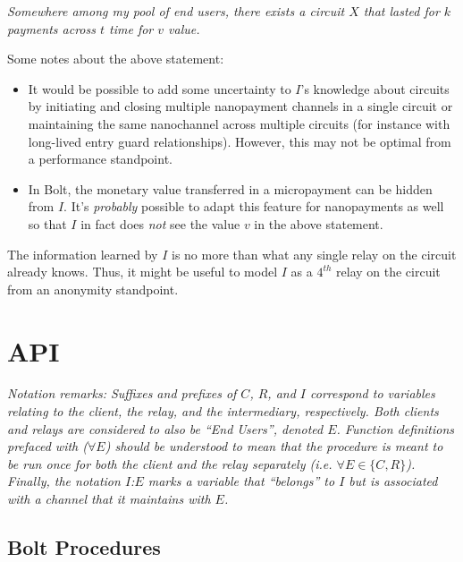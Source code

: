 \documentclass{article}
\begin{document}
\emph{Somewhere among my pool of end users, there exists a circuit $X$ that lasted for $k$ payments across $t$ time for $v$ value.}

Some notes about the above statement:
\begin{itemize}
\item It would be possible to add some uncertainty to $I$'s knowledge about circuits by initiating and closing multiple nanopayment channels in a single circuit or maintaining the same nanochannel across multiple circuits (for instance with long-lived entry guard relationships). However, this may not be optimal from a performance standpoint.
\item In Bolt, the monetary value transferred in a micropayment can be hidden from $I$. It's \emph{probably} possible to adapt this feature for nanopayments as well so that $I$ in fact does \emph{not} see the value $v$ in the above statement.
\end{itemize}
The information learned by $I$ is no more than what any single relay on the circuit already knows. Thus, it might be useful to model $I$ as a $4^{th}$ relay on the circuit from an anonymity standpoint.

\section{API}

\textit{Notation remarks: Suffixes and prefixes of $C$, $R$, and $I$ correspond to variables relating to the client, the relay, and the intermediary, respectively. Both clients and relays are considered to also be ``End Users'', denoted $E$. Function definitions prefaced with ($\forall E$) should be understood to mean that the procedure is meant to be run once for both the client and the relay separately (i.e. $\forall E \in \{C, R\}$). Finally, the notation $I$:$E$ marks a variable that ``belongs'' to $I$ but is associated with a channel that it maintains with $E$.}

\subsection{Bolt Procedures}
\end{document}
